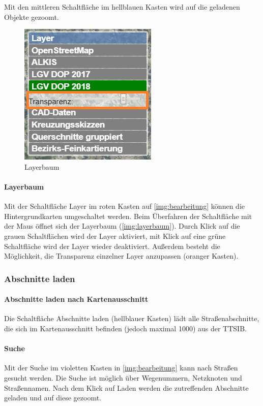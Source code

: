 \documentclass[a4paper,11pt,bibliography=totoc, listof=totoc,titlepage]{scrartcl}
\begin{document}
Mit den mittleren Schaltfläche im hellblauen Kasten wird auf die geladenen Objekte gezoomt. 

\begin{figure}
 \centering
 \includegraphics[width=.4\textwidth]{./img/layerbaum.png}
 \caption{Layerbaum}
 \label{img:layerbaum}
\end{figure}

\paragraph{Layerbaum} Mit der Schaltfläche Layer im roten Kasten auf \autoref{img:bearbeitung} können die Hintergrundkarten umgeschaltet werden. Beim Überfahren der Schaltfläche mit der Maus öffnet sich der Layerbaum (\autoref{img:layerbaum}). Durch Klick auf die grauen Schaltflächen wird der Layer aktiviert, mit Klick auf eine grüne Schaltfläche wird der Layer wieder deaktiviert. Außerdem besteht die Möglichkeit, die Transparenz einzelner Layer anzupassen (oranger Kasten). 

\subsubsection{Abschnitte laden}
\label{ss:abschnitteladen}
\paragraph{Abschnitte laden nach Kartenausschnitt}
Die Schaltfläche Abschnitte laden (hellblauer Kasten) lädt alle Straßenabschnitte, die sich im Kartenausschnitt befinden (jedoch maximal 1000) aus der TTSIB.

\paragraph{Suche}
Mit der Suche im violetten Kasten in \autoref{img:bearbeitung} kann nach Straßen gesucht werden. Die Suche ist möglich über Wegenummern, Netzknoten und Straßennamen. Nach dem Klick auf Laden werden die zutreffenden Abschnitte geladen und auf diese gezoomt.
\end{document}
